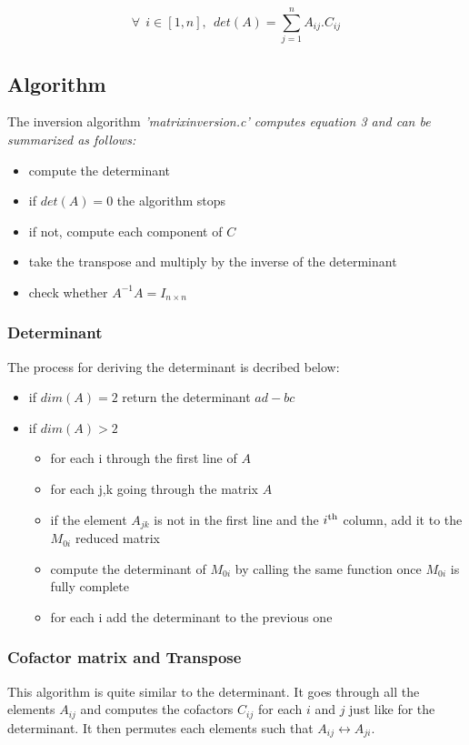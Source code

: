 \documentclass[10 pt]{article}
\begin{document}
\begin{multicols}{2}
\begin{equation}
\forall \ \ i \in \left[ 1,n\right],\ \ det(A) = \sum_{j=1}^n A_{ij} . C_{ij}
\end{equation}

\subsection{Algorithm}

The inversion algorithm \it 'matrix\textunderscore inversion.c' \rm computes equation 3 and can be summarized as follows:
\begin{itemize}
\item compute the determinant
\item if $det(A) = 0$ the algorithm stops
\item if not, compute each component of $C$
\item take the transpose and multiply by the inverse of the determinant
\item check whether $A^{-1} A = I_{n\times n}$
\end{itemize}

\subsubsection{Determinant}
The process for deriving the determinant is decribed below:
\begin{itemize}
\item if $dim(A) = 2$ return the determinant $ad - bc$
\item if $dim(A) > 2$
\begin{itemize}
\item for each i through the first line of $A$
\item for each j,k going through the matrix $A$
\item if the element $A_{jk}$ is not in the first line and the $i\textsuperscript{th}$ column, add it to the $M_{0i}$ reduced matrix
\item compute the determinant of $M_{0i}$ by calling the same function once  $M_{0i}$ is fully complete
\item for each i add the determinant to the previous one
\end{itemize}
\end{itemize}

\subsubsection{Cofactor matrix and Transpose}
This algorithm is quite similar to the determinant. It goes through all the elements $A_{ij}$ and computes the cofactors $C_{ij}$ for each $i$ and $j$ just like for the determinant. It then permutes each elements such that $A_{ij} \leftrightarrow A_{ji}$.


\end{multicols}
\end{document}
